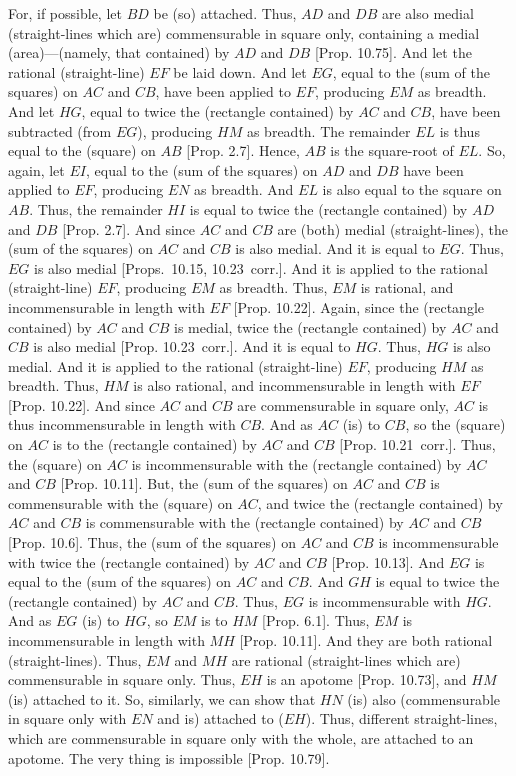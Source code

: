\begin{Parallel}{}{}
{For, if possible, let $BD$ be (so) attached. Thus, $AD$ and $DB$ are also medial (straight-lines which
are) commensurable in square only, containing a medial (area)---(namely,
that contained) by $AD$ and $DB$ [Prop. 10.75].
And let the rational (straight-line) $EF$ be laid down. And let $EG$,
equal to the (sum of the squares) on $AC$ and $CB$, have been applied
to $EF$, producing $EM$ as breadth. And let $HG$, equal to twice
the (rectangle contained) by $AC$ and $CB$, have been subtracted
(from $EG$), producing $HM$ as breadth. The remainder $EL$ is
thus equal to the (square) on $AB$ [Prop. 2.7]. 
Hence, $AB$ is the square-root of $EL$. So, again, let $EI$, equal to
the (sum of the squares) on $AD$ and $DB$ have been applied to $EF$,
producing $EN$ as breadth. And $EL$ is also equal to the square
on $AB$. Thus, the remainder 
$HI$ is equal to twice the (rectangle contained) by $AD$ and $DB$ [Prop. 2.7]. And since $AC$ and $CB$ are
(both) medial (straight-lines), the (sum of the squares) on $AC$ and $CB$ is also medial.
And it is equal to $EG$. Thus, $EG$ is also medial [Props.~10.15, 10.23~corr.]. And it is
applied to the rational (straight-line) $EF$, producing $EM$ as breadth.
Thus, $EM$ is rational, and incommensurable in length with $EF$
[Prop. 10.22]. Again, since the (rectangle
contained) by $AC$ and $CB$ is medial, twice the (rectangle
contained) by $AC$ and $CB$ is also medial [Prop. 10.23~corr.]. And it is equal to $HG$.
Thus, $HG$ is also medial. And it is applied to the rational (straight-line)
$EF$, producing $HM$ as breadth. Thus, $HM$ is also rational, and
incommensurable in length with $EF$ [Prop. 10.22]. And since $AC$ and $CB$ are commensurable in square only, $AC$ is thus incommensurable in length with $CB$.  And as $AC$ (is)
to $CB$, so the (square) on $AC$
is to the (rectangle contained) by $AC$ and $CB$ [Prop. 10.21~corr.]. Thus, the (square) on $AC$
is incommensurable with the (rectangle contained) by $AC$ and $CB$
[Prop. 10.11].
But, the (sum of the squares) on $AC$ and $CB$ is commensurable
with the (square) on $AC$, and twice the (rectangle contained) by $AC$ and
$CB$ is commensurable with the (rectangle contained) by $AC$ and $CB$ [Prop. 10.6].
Thus, the (sum of the squares) on $AC$ and $CB$ is incommensurable
with twice the (rectangle contained) by $AC$ and $CB$ [Prop. 10.13]. And $EG$ is equal to
the (sum of the squares) on $AC$ and $CB$. And $GH$ is equal
to twice the (rectangle contained) by $AC$ and $CB$. Thus, 
$EG$ is incommensurable with $HG$. And as $EG$ (is) to $HG$,
so $EM$ is to $HM$ [Prop. 6.1]. 
Thus, $EM$ is incommensurable in length with $MH$ [Prop. 10.11]. And they are both rational (straight-lines).
Thus, $EM$ and $MH$ are rational (straight-lines which are)
commensurable in square only. Thus, $EH$ is an apotome
[Prop. 10.73], and $HM$ (is) attached to
it. So, similarly, we can show that $HN$ (is) also (commensurable
in square only with $EN$ and is) attached to ($EH$). 
Thus, different straight-lines, which are commensurable
in square only with the whole, are attached to an apotome.
The very thing is impossible [Prop. 10.79].

}
\end{Parallel}

